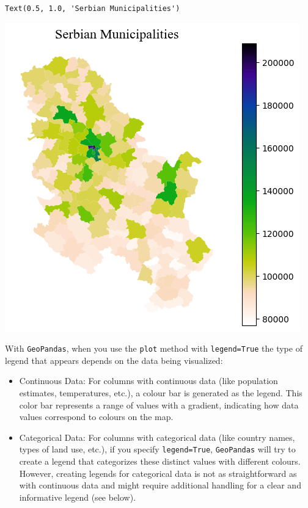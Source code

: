 \documentclass[
  letterpaper,
  DIV=11,
  numbers=noendperiod]{scrreprt}
\providecommand{\tightlist}{%
  \setlength{\itemsep}{0pt}\setlength{\parskip}{0pt}}\usepackage{longtable,booktabs,array}
\begin{document}
\begin{verbatim}
Text(0.5, 1.0, 'Serbian Municipalities')
\end{verbatim}

\includegraphics{labs/w02_maps_files/figure-pdf/cell-33-output-2.png}

With \texttt{GeoPandas}, when you use the \texttt{plot} method with
\texttt{legend=True} the type of legend that appears depends on the data
being visualized:

\begin{itemize}
\tightlist
\item
  Continuous Data: For columns with continuous data (like population
  estimates, temperatures, etc.), a colour bar is generated as the
  legend. This color bar represents a range of values with a gradient,
  indicating how data values correspond to colours on the map.
\item
  Categorical Data: For columns with categorical data (like country
  names, types of land use, etc.), if you specify \texttt{legend=True},
  \texttt{GeoPandas} will try to create a legend that categorizes these
  distinct values with different colours. However, creating legends for
  categorical data is not as straightforward as with continuous data and
  might require additional handling for a clear and informative legend
  (see below).
\end{itemize}
\end{document}
